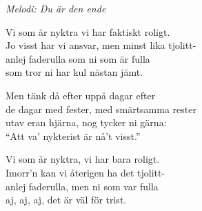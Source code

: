 {\footnotesize\textit{Melodi: Du är den ende}}\par
\vspace{10pt}
Vi som är nyktra vi har faktiskt roligt.\\
Jo visst har vi ansvar, men minst lika tjolitt-\\
anlej faderulla som ni som är fulla\\
som tror ni har kul nästan jämt.\par
\vspace{10pt}
Men tänk då efter uppå dagar efter\\
de dagar med fester, med smärtsamma rester\\
utav eran hjärna, nog tycker ni gärna:\\
``Att va' nykterist är nå't visst.''\par
\vspace{10pt}
Vi som är nyktra, vi har bara roligt.\\
Imorr'n kan vi återigen ha det tjolitt-\\
anlej faderulla, men ni som var fulla\\
aj, aj, aj, det är väl för trist.
